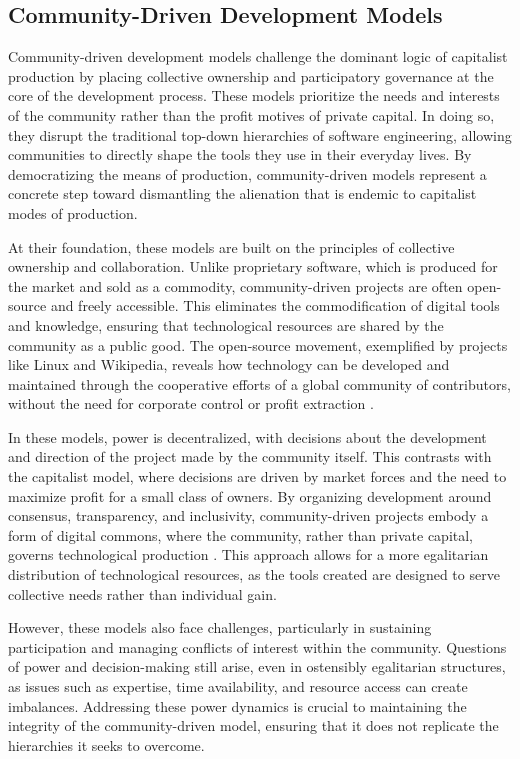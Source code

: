 \begin{refsection}
\section{Community-Driven Development Models}

Community-driven development models challenge the dominant logic of capitalist production by placing collective ownership and participatory governance at the core of the development process. These models prioritize the needs and interests of the community rather than the profit motives of private capital. In doing so, they disrupt the traditional top-down hierarchies of software engineering, allowing communities to directly shape the tools they use in their everyday lives. By democratizing the means of production, community-driven models represent a concrete step toward dismantling the alienation that is endemic to capitalist modes of production.

At their foundation, these models are built on the principles of collective ownership and collaboration. Unlike proprietary software, which is produced for the market and sold as a commodity, community-driven projects are often open-source and freely accessible. This eliminates the commodification of digital tools and knowledge, ensuring that technological resources are shared by the community as a public good. The open-source movement, exemplified by projects like Linux and Wikipedia, reveals how technology can be developed and maintained through the cooperative efforts of a global community of contributors, without the need for corporate control or profit extraction \cite[pp.~31-33]{marx2008}.

In these models, power is decentralized, with decisions about the development and direction of the project made by the community itself. This contrasts with the capitalist model, where decisions are driven by market forces and the need to maximize profit for a small class of owners. By organizing development around consensus, transparency, and inclusivity, community-driven projects embody a form of digital commons, where the community, rather than private capital, governs technological production \cite[pp.~68-71]{kelty2008}. This approach allows for a more egalitarian distribution of technological resources, as the tools created are designed to serve collective needs rather than individual gain.

However, these models also face challenges, particularly in sustaining participation and managing conflicts of interest within the community. Questions of power and decision-making still arise, even in ostensibly egalitarian structures, as issues such as expertise, time availability, and resource access can create imbalances. Addressing these power dynamics is crucial to maintaining the integrity of the community-driven model, ensuring that it does not replicate the hierarchies it seeks to overcome.


\end{refsection}
